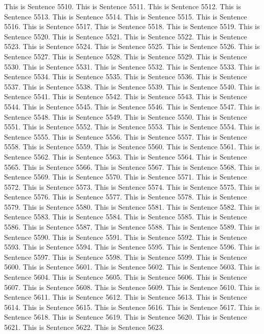 \documentclass{article}
\begin{document}
This is Sentence 5510.
This is Sentence 5511.
This is Sentence 5512.
This is Sentence 5513.
This is Sentence 5514.
This is Sentence 5515.
This is Sentence 5516.
This is Sentence 5517.
This is Sentence 5518.
This is Sentence 5519.
This is Sentence 5520.
This is Sentence 5521.
This is Sentence 5522.
This is Sentence 5523.
This is Sentence 5524.
This is Sentence 5525.
This is Sentence 5526.
This is Sentence 5527.
This is Sentence 5528.
This is Sentence 5529.
This is Sentence 5530.
This is Sentence 5531.
This is Sentence 5532.
This is Sentence 5533.
This is Sentence 5534.
This is Sentence 5535.
This is Sentence 5536.
This is Sentence 5537.
This is Sentence 5538.
This is Sentence 5539.
This is Sentence 5540.
This is Sentence 5541.
This is Sentence 5542.
This is Sentence 5543.
This is Sentence 5544.
This is Sentence 5545.
This is Sentence 5546.
This is Sentence 5547.
This is Sentence 5548.
This is Sentence 5549.
This is Sentence 5550.
This is Sentence 5551.
This is Sentence 5552.
This is Sentence 5553.
This is Sentence 5554.
This is Sentence 5555.
This is Sentence 5556.
This is Sentence 5557.
This is Sentence 5558.
This is Sentence 5559.
This is Sentence 5560.
This is Sentence 5561.
This is Sentence 5562.
This is Sentence 5563.
This is Sentence 5564.
This is Sentence 5565.
This is Sentence 5566.
This is Sentence 5567.
This is Sentence 5568.
This is Sentence 5569.
This is Sentence 5570.
This is Sentence 5571.
This is Sentence 5572.
This is Sentence 5573.
This is Sentence 5574.
This is Sentence 5575.
This is Sentence 5576.
This is Sentence 5577.
This is Sentence 5578.
This is Sentence 5579.
This is Sentence 5580.
This is Sentence 5581.
This is Sentence 5582.
This is Sentence 5583.
This is Sentence 5584.
This is Sentence 5585.
This is Sentence 5586.
This is Sentence 5587.
This is Sentence 5588.
This is Sentence 5589.
This is Sentence 5590.
This is Sentence 5591.
This is Sentence 5592.
This is Sentence 5593.
This is Sentence 5594.
This is Sentence 5595.
This is Sentence 5596.
This is Sentence 5597.
This is Sentence 5598.
This is Sentence 5599.
This is Sentence 5600.
This is Sentence 5601.
This is Sentence 5602.
This is Sentence 5603.
This is Sentence 5604.
This is Sentence 5605.
This is Sentence 5606.
This is Sentence 5607.
This is Sentence 5608.
This is Sentence 5609.
This is Sentence 5610.
This is Sentence 5611.
This is Sentence 5612.
This is Sentence 5613.
This is Sentence 5614.
This is Sentence 5615.
This is Sentence 5616.
This is Sentence 5617.
This is Sentence 5618.
This is Sentence 5619.
This is Sentence 5620.
This is Sentence 5621.
This is Sentence 5622.
This is Sentence 5623.
\end{document}
